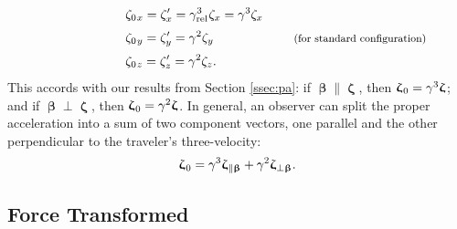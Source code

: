 \documentclass[12pt]{article}
\newcommand{\vvbeta}{\bm{\upbeta}}
\newcommand{\vvzeta}{\bm{\upzeta}}
\begin{document}
\begin{equation*}
\begin{aligned}
\qquad \qquad \qquad & \zeta_{0 \mkern1.5mu x} = \zeta_x^\prime  = \gamma_{\textrm{rel}}^3 \mkern1mu \zeta_x = \gamma^3 \zeta_x \\[2pt]
& \zeta_{0 \mkern1.5mu y} = \zeta_y^\prime  = \gamma^2  \zeta_y  \qquad \qquad \qquad \textrm{\footnotesize{ (for standard configuration)}} \\[2pt]
& \zeta_{0 \mkern1.5mu z} = \zeta_z^\prime  = \gamma^2 \zeta_z .
\end{aligned}
\end{equation*}
This accords with our results from Section \ref{ssec:pa}: if $\vvbeta \parallel \vvzeta$, then $\vvzeta_{\mkern1mu 0} = \gamma^3 \vvzeta$; and if $\vvbeta \perp \vvzeta$, then $\vvzeta_{\mkern1mu 0} = \gamma^2 \vvzeta$. In general, an observer can split the proper acceleration into a sum of two component vectors, one parallel and the other perpendicular to the traveler's three-velocity:
\begin{equation}\label{eq:pa}
\vvzeta_{\mkern1mu 0} = \gamma^3 \vvzeta_{\parallel \vvbeta} + \gamma^2 \vvzeta_{\perp \vvbeta}.
\end{equation}

\subsection{Force Transformed}\label{ssec:ft}
\end{document}
